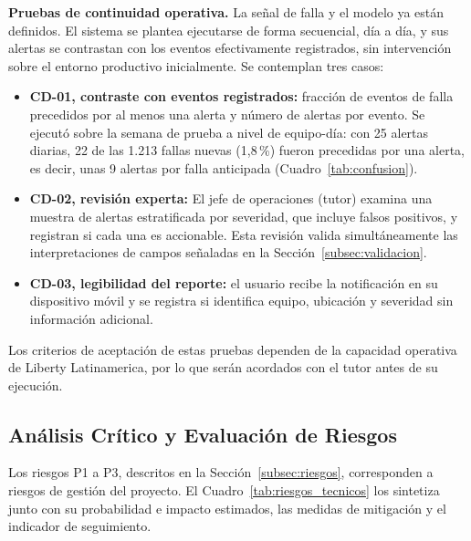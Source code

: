 \documentclass[12pt,a4paper]{article}
\begin{document}
\textbf{Pruebas de continuidad operativa.} 
\newline
La señal de falla y el modelo ya están definidos. El sistema se plantea ejecutarse de forma secuencial, día a día,  y sus alertas se contrastan con los eventos efectivamente registrados, sin intervención
 sobre el entorno productivo inicialmente. Se contemplan tres casos:
\begin{itemize}
    \item \textbf{CD-01, contraste con eventos registrados:} fracción de eventos de falla precedidos por al menos una alerta y número de alertas por evento. Se ejecutó sobre la semana de prueba a nivel de equipo-día: con 25 alertas diarias, 22 de las 1.213 fallas nuevas (1,8\,\%) fueron precedidas por una alerta, es decir, unas 9 alertas por falla anticipada (Cuadro~\ref{tab:confusion}).
    \item \textbf{CD-02, revisión experta:} El jefe de operaciones (tutor) examina una muestra de alertas estratificada por severidad, que incluye falsos positivos, y registran si cada una es accionable. Esta revisión valida simultáneamente las interpretaciones de campos señaladas en la Sección~\ref{subsec:validacion}.
    \item \textbf{CD-03, legibilidad del reporte:} el usuario recibe la notificación en su dispositivo móvil y se registra si identifica equipo, ubicación y severidad sin información adicional.
\end{itemize}
Los criterios de aceptación de estas pruebas dependen de la capacidad operativa de Liberty Latinamerica, por lo que serán acordados con el tutor antes de su ejecución. 

\subsection{Análisis Crítico y Evaluación de Riesgos}
\label{subsec:riesgos_tecnicos}
\noindent
Los riesgos P1 a P3, descritos en la Sección~\ref{subsec:riesgos}, corresponden a riesgos de gestión del proyecto. El Cuadro~\ref{tab:riesgos_tecnicos} los sintetiza junto con su probabilidad e impacto estimados, las medidas de mitigación y el indicador de seguimiento.
\end{document}
